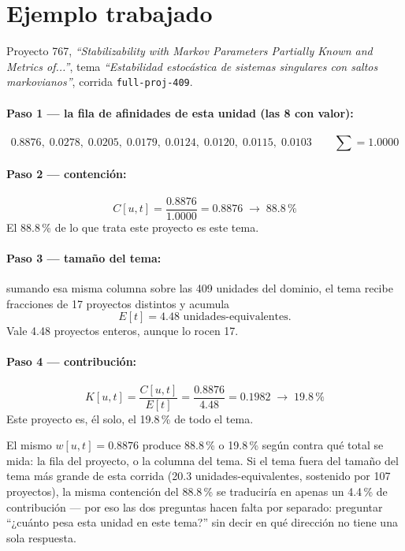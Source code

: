 \documentclass[11pt]{article}
\newcommand{\afinidad}{w}
\begin{document}
\section{Ejemplo trabajado}
\label{sec:ejemplo}

Proyecto 767, \emph{``Stabilizability with Markov Parameters Partially
Known and Metrics of...''}, tema \emph{``Estabilidad estocástica de sistemas
singulares con saltos markovianos''}, corrida \texttt{full-proj-409}.

\paragraph{Paso 1 --- la fila de afinidades de esta unidad (las 8 con valor):}
\[
  0.8876,\; 0.0278,\; 0.0205,\; 0.0179,\; 0.0124,\; 0.0120,\; 0.0115,\; 0.0103
  \qquad \sum = 1.0000
\]

\paragraph{Paso 2 --- contención:}
\[
  C[u,t] = \frac{0.8876}{1.0000} = 0.8876 \;\to\; 88.8\,\text{\%}
\]
El 88.8\,\% de lo que trata este proyecto es este tema.

\paragraph{Paso 3 --- tamaño del tema:} sumando esa misma columna sobre las
409 unidades del dominio, el tema recibe fracciones de 17 proyectos
distintos y acumula
\[
  E[t] = 4.48 \text{ unidades-equivalentes.}
\]
Vale 4.48 proyectos enteros, aunque lo rocen 17.

\paragraph{Paso 4 --- contribución:}
\[
  K[u,t] = \frac{C[u,t]}{E[t]} = \frac{0.8876}{4.48} = 0.1982 \;\to\; 19.8\,\text{\%}
\]
Este proyecto es, él solo, el 19.8\,\% de todo el tema.

\medskip
\noindent
El mismo $\afinidad[u,t]=0.8876$ produce 88.8\,\% o 19.8\,\% según contra
qué total se mida: la fila del proyecto, o la columna del tema. Si el tema
fuera del tamaño del tema más grande de esta corrida (20.3
unidades-equivalentes, sostenido por 107 proyectos), la misma contención del
88.8\,\% se traduciría en apenas un 4.4\,\% de contribución --- por eso las
dos preguntas hacen falta por separado: preguntar ``¿cuánto pesa esta unidad
en este tema?'' sin decir en qué dirección no tiene una sola respuesta.
\end{document}
